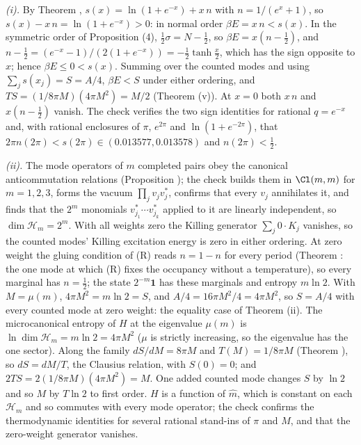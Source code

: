 \emph{(i).} By Theorem , $s(x) = \ln(1 + e^{-x}) + x\,n$ with $n = 1/(e^{x} + 1)$, so $s(x) - x\,n = \ln(1 + e^{-x}) > 0$: in normal order $\beta E = x\,n < s(x)$. In the symmetric order of Proposition (4), $\tfrac12\sigma = N - \tfrac12$, so $\beta E = x(n - \tfrac12)$, and $n - \tfrac12 = (e^{-x} - 1)/(2(1 + e^{-x})) = -\tfrac12\tanh\tfrac{x}{2}$, which has the sign opposite to $x$; hence $\beta E \le 0 < s(x)$. Summing over the counted modes and using $\sum_{j}s(x_{j}) = S = A/4$, $\beta E < S$ under either ordering, and $TS = (1/8\pi M)(4\pi M^{2}) = M/2$ (Theorem (v)). At $x = 0$ both $x\,n$ and $x(n - \tfrac12)$ vanish. The check verifies the two sign identities for rational $q = e^{-x}$ and, with rational enclosures of $\pi$, $e^{2\pi}$ and $\ln(1 + e^{-2\pi})$, that $2\pi n(2\pi) < s(2\pi) \in (0.013577, 0.013578)$ and $n(2\pi) < \tfrac12$.

\emph{(ii).} The mode operators of $m$ completed pairs obey the canonical anticommutation relations (Proposition ); the check builds them in $\Cl(m,m)$ for $m = 1, 2, 3$, forms the vacuum $\prod_{j}v_{j}v_{j}^{*}$, confirms that every $v_{j}$ annihilates it, and finds that the $2^{m}$ monomials $v_{j_{1}}^{*}\cdots v_{j_{k}}^{*}$ applied to it are linearly independent, so $\dim\mathcal{H}_{m} = 2^{m}$. With all weights zero the Killing generator $\sum_{j}0\cdot K_{j}$ vanishes, so the counted modes' Killing excitation energy is zero in either ordering. At zero weight the gluing condition of (R) reads $n = 1 - n$ for every period (Theorem : the one mode at which (R) fixes the occupancy without a temperature), so every marginal has $n = \tfrac12$; the state $2^{-m}\mathbf{1}$ has these marginals and entropy $m\ln 2$. With $M = \mu(m)$, $4\pi M^{2} = m\ln 2 = S$, and $A/4 = 16\pi M^{2}/4 = 4\pi M^{2}$, so $S = A/4$ with every counted mode at zero weight: the equality case of Theorem (ii). The microcanonical entropy of $H$ at the eigenvalue $\mu(m)$ is $\ln\dim\mathcal{H}_{m} = m\ln 2 = 4\pi M^{2}$ ($\mu$ is strictly increasing, so the eigenvalue has the one sector). Along the family $dS/dM = 8\pi M$ and $T(M) = 1/8\pi M$ (Theorem ), so $dS = dM/T$, the Clausius relation, with $S(0) = 0$; and $2TS = 2(1/8\pi M)(4\pi M^{2}) = M$. One added counted mode changes $S$ by $\ln 2$ and so $M$ by $T\ln 2$ to first order. $H$ is a function of $\hat m$, which is constant on each $\mathcal{H}_{m}$ and so commutes with every mode operator; the check confirms the thermodynamic identities for several rational stand-ins of $\pi$ and $M$, and that the zero-weight generator vanishes.

